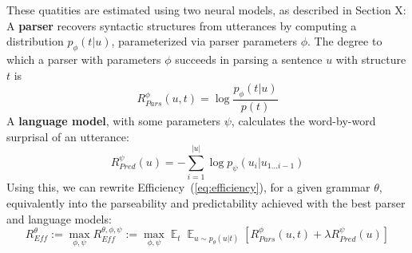 \documentclass[10pt,twoside,lineno]{article}
\DeclareMathOperator*{\argmax}{arg\,max}
\DeclareMathOperator{\E}{\mathop{\mathbb{E}}}
\newcommand{\key}[1]{\textbf{#1}}
\begin{document}
These quatities are estimated using two neural models, as described in Section X:
A \key{parser} recovers syntactic structures from utterances by computing a distribution $p_\phi(t|u)$, parameterized via parser parameters $\phi$.
The degree to which a parser with parameters $\phi$ succeeds in parsing a sentence $u$ with structure $t$ is
\begin{equation}
	R_{Pars}^{\phi}(u,t) =  \log \frac{p_\phi(t|u)}{p(t)}
\end{equation}
%
A \key{language model}, with some parameters $\psi$, calculates the word-by-word surprisal of an utterance:
\begin{equation}
	R_{Pred}^{\psi}(u) = - \sum_{i=1}^{|u|} \log p_\psi(u_i|u_{1\dots i-1})
\end{equation}
Using this, we can rewrite Efficiency~(\ref{eq:efficiency}), for a given grammar $\theta$, equivalently into the parseability and predictability achieved with the best parser and language models:
\begin{equation}
	R_{\textit{Eff}}^{\theta} := \max_{\phi,\psi} R_{\textit{Eff}}^{\theta, \phi, \psi} := \max_{\phi,\psi} \E_t \E_{u \sim p_\theta(u|t)} \left[R_{Pars}^{\phi}(u,t) + \lambda R_{Pred}^{\psi}(u)\right]
\end{equation}
%
%
\end{document}
